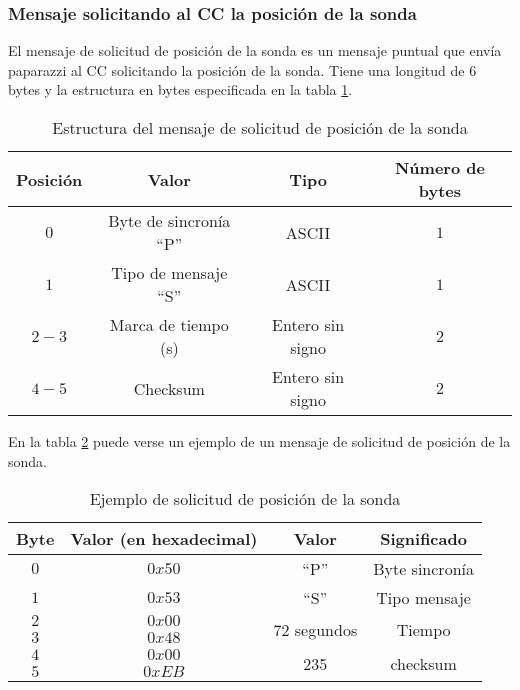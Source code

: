 \subsubsection{Mensaje solicitando al CC la posición de la sonda}

El mensaje de solicitud de posición de la sonda es un mensaje puntual que envía paparazzi al CC solicitando la posición de la sonda. Tiene una longitud de $6$ bytes y la estructura en bytes especificada en la tabla \ref{tab6}.

\begin{table}[h]
	\centering
	\caption{Estructura del mensaje de solicitud de posición de la sonda}
	\begin{tabular}{|c|c|c|c|}\hline 
		\textbf{Posición}	& \textbf{Valor} & \textbf{Tipo} &\textbf{Número de bytes} \\ \hline \hline 
		$0$		& Byte de sincronía ``P''				& ASCII	 			&	$1$ \\  \hline
		$1$		& Tipo de mensaje ``S''				& ASCII	 			&	$1$ \\  \hline
		$2-3$	& Marca de tiempo (s)				& Entero sin signo	&   $2$ \\  \hline
		$4-5$	& Checksum 							& Entero sin signo	&   $2$ \\  \hline
	\end{tabular}
	\label{tab6}
\end{table}

En la tabla \ref{tab7} puede verse un ejemplo de un mensaje de solicitud de posición de la sonda.

\begin{table}[h]
	\centering
	\caption{Ejemplo de solicitud de posición de la sonda}
	\begin{tabular}{|c|c|c|c|}\hline
		\textbf{Byte} 	&	\textbf{Valor (en hexadecimal)}	&\textbf{Valor}	&\textbf{Significado} \\ \hline \hline
		$0$ 			&  $0x50$			& ``P''	& Byte sincronía	\\ \hline
		$1$				&  $0x53$			& ``S''	& Tipo mensaje		\\ \hline
		$2$				&  $0x00$			& \multirow{2}{*}{$72$ segundos} & \multirow{2}{*}{Tiempo} \\
		$3$				&  $0x48$			&  & \\ \hline	
		$4$				&  $0x00$			&  \multirow{2}{*}{235}	& \multirow{2}{*}{checksum} \\
		$5$				&  $0xEB$			&     &     \\ \hline	
		
		
	\end{tabular}
	\label{tab7}
\end{table}

